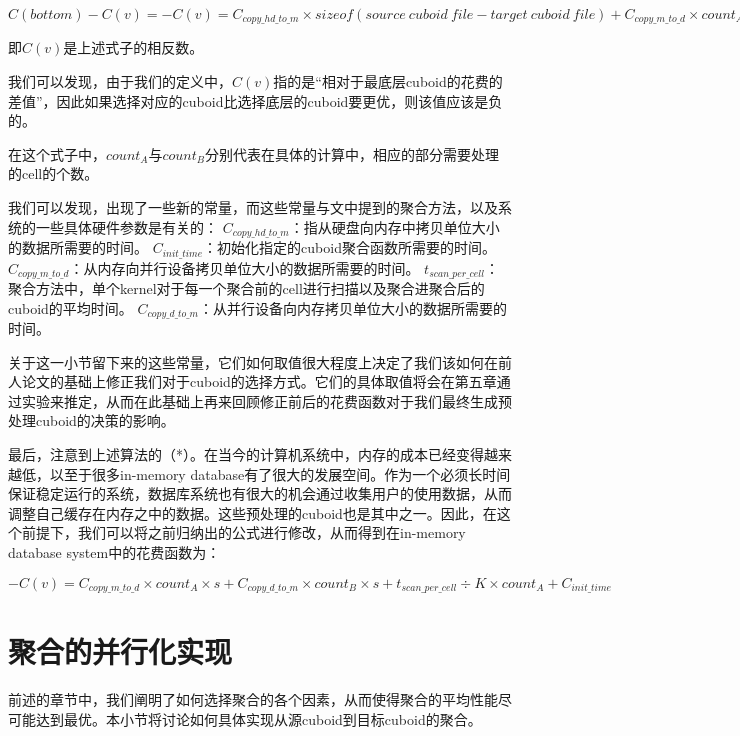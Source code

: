 \begin{definition}
$C(bottom) - C(v) = - C(v) = C_{copy\_hd\_to\_m} \times sizeof(source\ cuboid\ file - target\ cuboid\ file) + C_{copy\_m\_to\_d} \times count_A \times s + C_{copy\_d\_to\_m} \times count_B \times s + t_{scan\_per\_cell} \div K \times count_A + C_{init\_time}$
\end{definition}

即$C(v)$是上述式子的相反数。

我们可以发现，由于我们的定义中，$C(v)$指的是“相对于最底层cuboid的花费的差值”，因此如果选择对应的cuboid比选择底层的cuboid要更优，则该值应该是负的。

在这个式子中，$count_A$与$count_B$分别代表在具体的计算中，相应的部分需要处理的cell的个数。

我们可以发现，出现了一些新的常量，而这些常量与文中提到的聚合方法，以及系统的一些具体硬件参数是有关的：
$C_{copy\_hd\_to\_m}$：指从硬盘向内存中拷贝单位大小的数据所需要的时间。
$C_{init\_time}$：初始化指定的cuboid聚合函数所需要的时间。
$C_{copy\_m\_to\_d}$：从内存向并行设备拷贝单位大小的数据所需要的时间。
$t_{scan\_per\_cell}$：聚合方法中，单个kernel对于每一个聚合前的cell进行扫描以及聚合进聚合后的cuboid的平均时间。
$C_{copy\_d\_to\_m}$：从并行设备向内存拷贝单位大小的数据所需要的时间。

关于这一小节留下来的这些常量，它们如何取值很大程度上决定了我们该如何在前人论文的基础上修正我们对于cuboid的选择方式。它们的具体取值将会在第五章通过实验来推定，从而在此基础上再来回顾修正前后的花费函数对于我们最终生成预处理cuboid的决策的影响。

最后，注意到上述算法的（*）。在当今的计算机系统中，内存的成本已经变得越来越低，以至于很多in-memory database有了很大的发展空间。作为一个必须长时间保证稳定运行的系统，数据库系统也有很大的机会通过收集用户的使用数据，从而调整自己缓存在内存之中的数据。这些预处理的cuboid也是其中之一。因此，在这个前提下，我们可以将之前归纳出的公式进行修改，从而得到在in-memory database system中的花费函数为：
\begin{definition}
$- C(v) = C_{copy\_m\_to\_d} \times count_A \times s + C_{copy\_d\_to\_m} \times count_B \times s + t_{scan\_per\_cell} \div K \times count_A + C_{init\_time}$
\end{definition}


\section{聚合的并行化实现}
前述的章节中，我们阐明了如何选择聚合的各个因素，从而使得聚合的平均性能尽可能达到最优。本小节将讨论如何具体实现从源cuboid到目标cuboid的聚合。

